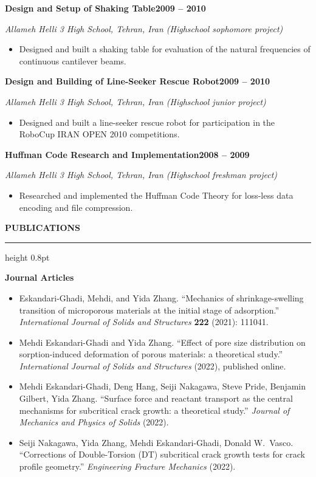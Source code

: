 \documentclass[10pt, letterpaper]{article}
\newcommand{\rsection}[1]{%
  \vspace{10pt}%
  {\large\bfseries\MakeUppercase{#1}}%
  \vspace{1pt}%
  \hrule height 0.8pt%
  \vspace{5pt}%
}
\newcommand{\jobline}[2]{%
  \vspace{5pt}%
  \noindent\textbf{#1}\hfill\textbf{#2}\par%
  \vspace{1pt}%
}
\newcommand{\subline}[1]{%
  \vspace{-1pt}%
  \noindent\textit{#1}\par%
  \vspace{1pt}%
}
\newenvironment{rlist}{%
  \begin{itemize}[leftmargin=1.4em, itemsep=1pt, topsep=2pt, parsep=0pt]%
}{%
  \end{itemize}%
}
\newenvironment{publist}{%
  \begin{itemize}[leftmargin=1.4em, itemsep=4pt, topsep=2pt, parsep=0pt]%
}{%
  \end{itemize}%
}
\begin{document}
\jobline{Design and Setup of Shaking Table}{2009 -- 2010}
\subline{Allameh Helli 3 High School, Tehran, Iran (Highschool sophomore project)}
\begin{rlist}
  \item Designed and built a shaking table for evaluation of the natural frequencies of continuous cantilever beams.
\end{rlist}

\jobline{Design and Building of Line-Seeker Rescue Robot}{2009 -- 2010}
\subline{Allameh Helli 3 High School, Tehran, Iran (Highschool junior project)}
\begin{rlist}
  \item Designed and built a line-seeker rescue robot for participation in the RoboCup IRAN OPEN 2010 competitions.
\end{rlist}

\jobline{Huffman Code Research and Implementation}{2008 -- 2009}
\subline{Allameh Helli 3 High School, Tehran, Iran (Highschool freshman project)}
\begin{rlist}
  \item Researched and implemented the Huffman Code Theory for loss-less data encoding and file compression.
\end{rlist}

\rsection{Publications}

\noindent\textbf{Journal Articles}

\begin{publist}
  \item Eskandari-Ghadi, Mehdi, and Yida Zhang. ``Mechanics of shrinkage-swelling transition of microporous materials at the initial stage of adsorption.'' \textit{International Journal of Solids and Structures} \textbf{222} (2021): 111041.
  \item Mehdi Eskandari-Ghadi and Yida Zhang. ``Effect of pore size distribution on sorption-induced deformation of porous materials: a theoretical study.'' \textit{International Journal of Solids and Structures} (2022), published online.
  \item Mehdi Eskandari-Ghadi, Deng Hang, Seiji Nakagawa, Steve Pride, Benjamin Gilbert, Yida Zhang. ``Surface force and reactant transport as the central mechanisms for subcritical crack growth: a theoretical study.'' \textit{Journal of Mechanics and Physics of Solids} (2022).
  \item Seiji Nakagawa, Yida Zhang, Mehdi Eskandari-Ghadi, Donald W.\ Vasco. ``Corrections of Double-Torsion (DT) subcritical crack growth tests for crack profile geometry.'' \textit{Engineering Fracture Mechanics} (2022).
\end{publist}
\end{document}
